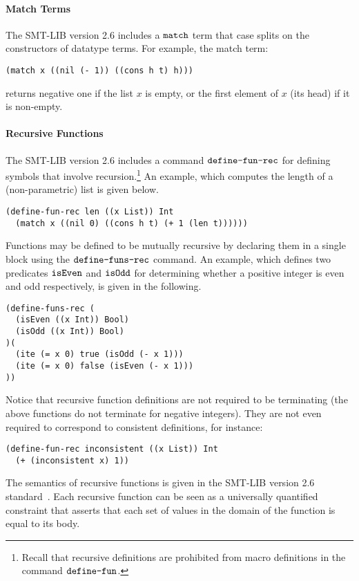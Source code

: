 \documentclass[english,a4paper,10pt]{article}
\begin{document}
\begin{appendix}
\paragraph{Match Terms}
The SMT-LIB version 2.6 includes a ${\tt match}$ term
that case splits on the constructors of datatype terms.
For example,
the match term:
\begin{lstlisting}
(match x ((nil (- 1)) ((cons h t) h)))
\end{lstlisting}
returns negative one if the list $x$ is empty,
or the first element of $x$ (its head) if it is non-empty.

\paragraph{Recursive Functions}
The SMT-LIB version 2.6 includes a command $\texttt{define-fun-rec}$
for defining symbols that involve recursion.\footnote{
Recall that recursive definitions are prohibited from macro definitions in the command
$\texttt{define-fun}$.
}
An example, which computes the length of a (non-parametric) list 
is given below.
\begin{lstlisting}
(define-fun-rec len ((x List)) Int 
  (match x ((nil 0) ((cons h t) (+ 1 (len t))))))
\end{lstlisting}
Functions may be defined to be mutually recursive by declaring
them in a single block using the $\texttt{define-funs-rec}$ command.
An example, which defines two predicates ${\tt isEven}$ and ${\tt isOdd}$
for determining whether a positive integer is even and odd respectively,
is given in the following.
\begin{lstlisting}
(define-funs-rec (
  (isEven ((x Int)) Bool)
  (isOdd ((x Int)) Bool)
)(
  (ite (= x 0) true (isOdd (- x 1)))
  (ite (= x 0) false (isEven (- x 1)))
))
\end{lstlisting}
Notice that recursive function definitions are not required to be terminating
(the above functions do not terminate for negative integers).
They are not even required to correspond to consistent definitions, for instance:
\begin{lstlisting}
(define-fun-rec inconsistent ((x List)) Int 
  (+ (inconsistent x) 1))
\end{lstlisting}
The semantics of recursive functions is given in 
the SMT-LIB version 2.6 standard~\cite{BarFT-RR-17}.
Each recursive function can be seen as a universally quantified constraint
that asserts that each set of values in the domain of the function
is equal to its body.


\end{appendix}
\end{document}
